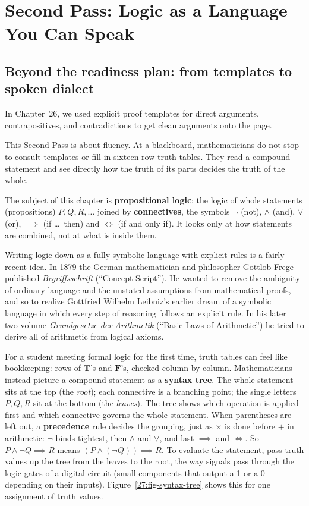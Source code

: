 \section{Second Pass: Logic as a Language You Can Speak}
\chapterline

\subsection{Beyond the readiness plan: from templates to spoken dialect}

In Chapter~26, we used explicit proof templates for direct arguments, contrapositives, and contradictions to get clean arguments onto the page.

This Second Pass is about fluency. At a blackboard, mathematicians do not stop to consult templates or fill in sixteen-row truth tables. They read a compound statement and see directly how the truth of its parts decides the truth of the whole.

The subject of this chapter is \textbf{propositional logic}: the logic of whole statements (propositions) $P, Q, R, \dots$ joined by \textbf{connectives}, the symbols $\neg$ (not), $\land$ (and), $\lor$ (or), $\implies$ (if \dots\ then) and $\iff$ (if and only if). It looks only at how statements are combined, not at what is inside them.

Writing logic down as a fully symbolic language with explicit rules is a fairly recent idea. In 1879 the German mathematician and philosopher Gottlob Frege published \emph{Begriffsschrift} (``Concept-Script''). He wanted to remove the ambiguity of ordinary language and the unstated assumptions from mathematical proofs, and so to realize Gottfried Wilhelm Leibniz's earlier dream of a symbolic language in which every step of reasoning follows an explicit rule. In his later two-volume \emph{Grundgesetze der Arithmetik} (``Basic Laws of Arithmetic'') he tried to derive all of arithmetic from logical axioms.

For a student meeting formal logic for the first time, truth tables can feel like bookkeeping: rows of $\mathbf{T}$'s and $\mathbf{F}$'s, checked column by column. Mathematicians instead picture a compound statement as a \textbf{syntax tree}. The whole statement sits at the top (the \emph{root}); each connective is a branching point; the single letters $P, Q, R$ sit at the bottom (the \emph{leaves}). The tree shows which operation is applied first and which connective governs the whole statement. When parentheses are left out, a \textbf{precedence} rule decides the grouping, just as $\times$ is done before $+$ in arithmetic: $\neg$ binds tightest, then $\land$ and $\lor$, and last $\implies$ and $\iff$. So $P \land \neg Q \implies R$ means $(P \land (\neg Q)) \implies R$. To evaluate the statement, pass truth values up the tree from the leaves to the root, the way signals pass through the logic gates of a digital circuit (small components that output a 1 or a 0 depending on their inputs). Figure~\ref{27:fig-syntax-tree} shows this for one assignment of truth values.

